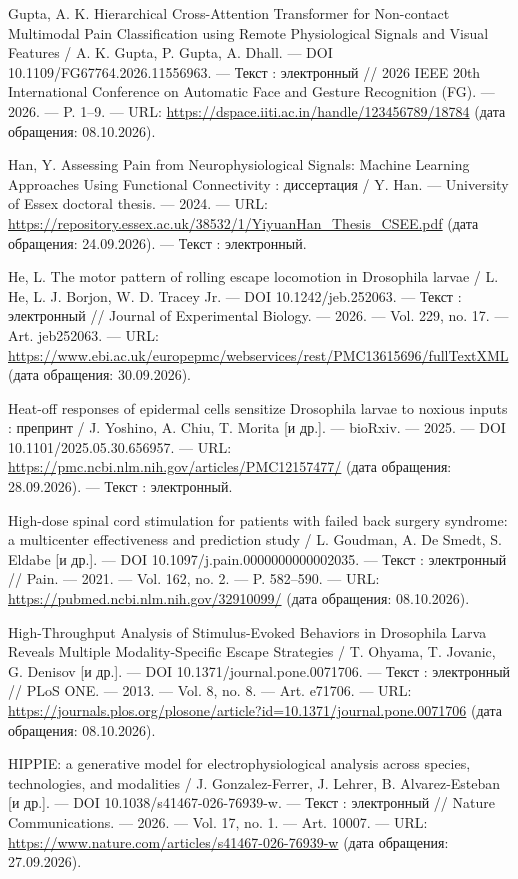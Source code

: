 \begin{list}{}{\setlength{\leftmargin}{10mm}\setlength{\labelwidth}{8mm}\setlength{\labelsep}{2mm}\setlength{\itemsep}{0pt}\setlength{\parsep}{0pt}\setlength{\topsep}{0pt}}
\item[144.] Gupta, A. K. Hierarchical Cross-Attention Transformer for Non-contact Multimodal Pain Classification using Remote Physiological Signals and Visual Features / A. K. Gupta, P. Gupta, A. Dhall. — DOI 10.1109/FG67764.2026.11556963. — Текст : электронный // 2026 IEEE 20th International Conference on Automatic Face and Gesture Recognition (FG). — 2026. — P. 1–9. — URL: \url{https://dspace.iiti.ac.in/handle/123456789/18784} (дата обращения: 08.10.2026).
\item[145.] Han, Y. Assessing Pain from Neurophysiological Signals: Machine Learning Approaches Using Functional Connectivity : диссертация / Y. Han. — University of Essex doctoral thesis. — 2024. — URL: \url{https://repository.essex.ac.uk/38532/1/YiyuanHan\_Thesis\_CSEE.pdf} (дата обращения: 24.09.2026). — Текст : электронный.
\item[146.] He, L. The motor pattern of rolling escape locomotion in Drosophila larvae / L. He, L. J. Borjon, W. D. Tracey Jr. — DOI 10.1242/jeb.252063. — Текст : электронный // Journal of Experimental Biology. — 2026. — Vol. 229, no. 17. — Art. jeb252063. — URL: \url{https://www.ebi.ac.uk/europepmc/webservices/rest/PMC13615696/fullTextXML} (дата обращения: 30.09.2026).
\item[147.] Heat-off responses of epidermal cells sensitize Drosophila larvae to noxious inputs : препринт / J. Yoshino, A. Chiu, T. Morita [и др.]. — bioRxiv. — 2025. — DOI 10.1101/2025.05.30.656957. — URL: \url{https://pmc.ncbi.nlm.nih.gov/articles/PMC12157477/} (дата обращения: 28.09.2026). — Текст : электронный.
\item[148.] High-dose spinal cord stimulation for patients with failed back surgery syndrome: a multicenter effectiveness and prediction study / L. Goudman, A. De Smedt, S. Eldabe [и др.]. — DOI 10.1097/j.pain.0000000000002035. — Текст : электронный // Pain. — 2021. — Vol. 162, no. 2. — P. 582–590. — URL: \url{https://pubmed.ncbi.nlm.nih.gov/32910099/} (дата обращения: 08.10.2026).
\item[149.] High-Throughput Analysis of Stimulus-Evoked Behaviors in Drosophila Larva Reveals Multiple Modality-Specific Escape Strategies / T. Ohyama, T. Jovanic, G. Denisov [и др.]. — DOI 10.1371/journal.pone.0071706. — Текст : электронный // PLoS ONE. — 2013. — Vol. 8, no. 8. — Art. e71706. — URL: \url{https://journals.plos.org/plosone/article?id=10.1371/journal.pone.0071706} (дата обращения: 08.10.2026).
\item[150.] HIPPIE: a generative model for electrophysiological analysis across species, technologies, and modalities / J. Gonzalez-Ferrer, J. Lehrer, B. Alvarez-Esteban [и др.]. — DOI 10.1038/s41467-026-76939-w. — Текст : электронный // Nature Communications. — 2026. — Vol. 17, no. 1. — Art. 10007. — URL: \url{https://www.nature.com/articles/s41467-026-76939-w} (дата обращения: 27.09.2026).

\end{list}
